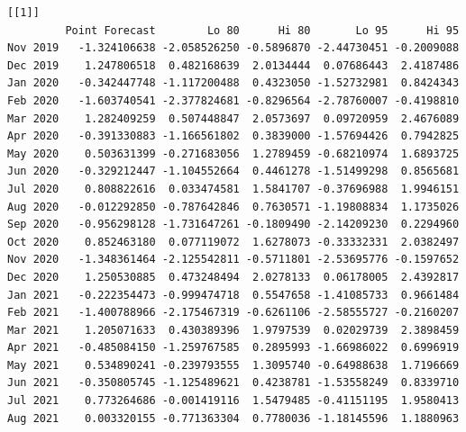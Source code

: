 \documentclass[
  number]{elsarticle}
\newenvironment{Shaded}{\begin{snugshade}}{\end{snugshade}}
\newcommand{\AttributeTok}[1]{\textcolor[rgb]{0.40,0.45,0.13}{#1}}
\newcommand{\DecValTok}[1]{\textcolor[rgb]{0.68,0.00,0.00}{#1}}
\newcommand{\FunctionTok}[1]{\textcolor[rgb]{0.28,0.35,0.67}{#1}}
\newcommand{\NormalTok}[1]{\textcolor[rgb]{0.00,0.23,0.31}{#1}}
\newcommand{\OtherTok}[1]{\textcolor[rgb]{0.00,0.23,0.31}{#1}}
\newcommand{\SpecialCharTok}[1]{\textcolor[rgb]{0.37,0.37,0.37}{#1}}
\begin{document}
\begin{Shaded}
\end{Shaded}

\begin{verbatim}
[[1]]
         Point Forecast        Lo 80      Hi 80       Lo 95      Hi 95
Nov 2019   -1.324106638 -2.058526250 -0.5896870 -2.44730451 -0.2009088
Dec 2019    1.247806518  0.482168639  2.0134444  0.07686443  2.4187486
Jan 2020   -0.342447748 -1.117200488  0.4323050 -1.52732981  0.8424343
Feb 2020   -1.603740541 -2.377824681 -0.8296564 -2.78760007 -0.4198810
Mar 2020    1.282409259  0.507448847  2.0573697  0.09720959  2.4676089
Apr 2020   -0.391330883 -1.166561802  0.3839000 -1.57694426  0.7942825
May 2020    0.503631399 -0.271683056  1.2789459 -0.68210974  1.6893725
Jun 2020   -0.329212447 -1.104552664  0.4461278 -1.51499298  0.8565681
Jul 2020    0.808822616  0.033474581  1.5841707 -0.37696988  1.9946151
Aug 2020   -0.012292850 -0.787642846  0.7630571 -1.19808834  1.1735026
Sep 2020   -0.956298128 -1.731647261 -0.1809490 -2.14209230  0.2294960
Oct 2020    0.852463180  0.077119072  1.6278073 -0.33332331  2.0382497
Nov 2020   -1.348361464 -2.125542811 -0.5711801 -2.53695776 -0.1597652
Dec 2020    1.250530885  0.473248494  2.0278133  0.06178005  2.4392817
Jan 2021   -0.222354473 -0.999474718  0.5547658 -1.41085733  0.9661484
Feb 2021   -1.400788966 -2.175467319 -0.6261106 -2.58555727 -0.2160207
Mar 2021    1.205071633  0.430389396  1.9797539  0.02029739  2.3898459
Apr 2021   -0.485084150 -1.259767585  0.2895993 -1.66986022  0.6996919
May 2021    0.534890241 -0.239793555  1.3095740 -0.64988638  1.7196669
Jun 2021   -0.350805745 -1.125489621  0.4238781 -1.53558249  0.8339710
Jul 2021    0.773264686 -0.001419116  1.5479485 -0.41151195  1.9580413
Aug 2021    0.003320155 -0.771363304  0.7780036 -1.18145596  1.1880963


\end{verbatim}
\end{document}
